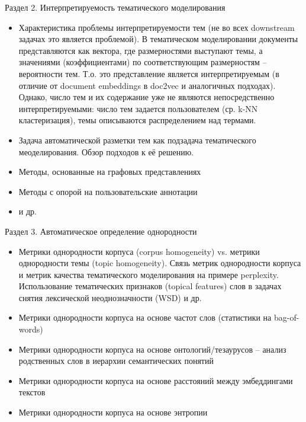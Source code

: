Раздел 2. Интерпретируемость тематического моделирования
\begin{itemize}
  \item Характеристика проблемы интерпретируемости тем (не во всех downstream задачах это является проблемой). В тематическом моделировании документы представляются как вектора, где размерностями выступают темы, а значениями (коэффициентами) по соответствующим размерностям -- вероятности тем. Т.о. это представление является интерпретируемым (в отличие от document embeddings в doc2vec и аналогичных подходах). Однако, число тем и их содержание уже не являются непосредственно интерпретируемыми: число тем задается пользователем (ср. k-NN кластеризация), темы описываются распределением над термами. 
  \item Задача автоматической разметки тем как подзадача тематического меоделирования. Обзор подходов к её решению.
  \item Методы, основанные на графовых представлениях
  \item Методы с опорой на пользовательские аннотации
  \item и др.
\end{itemize}

\bigskip

Раздел 3. Автоматическое определение однородности

\begin{itemize}
    \item Метрики однородности корпуса (corpus homogeneity) vs. метрики однородности темы (topic homogeneity). Связь метрик однородности корпуса и метрик качества тематического моделирования на примере perplexity. Использование тематических признаков (topical features) слов в задачах снятия лексической неоднозначности (WSD) и др.
    \item Метрики однородности корпуса на основе частот слов (статистики на bag-of-words)
    \item Метрики однородности корпуса на основе онтологий/тезаурусов – анализ родственных слов в иерархии
    семантических понятий
    \item Метрики однородности корпуса на основе расстояний между эмбеддингами текстов
    \item Метрики однородности корпуса на основе энтропии
\end{itemize}
